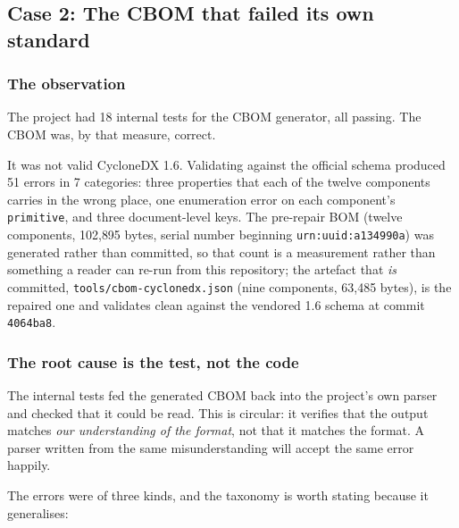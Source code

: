\subsection{Case 2: The CBOM that failed its own standard}
\label{sec:case-study-cbom}

\subsubsection{The observation}

The project had 18 internal tests for the CBOM generator, all passing. The CBOM
was, by that measure, correct.

It was not valid CycloneDX 1.6. Validating against the official schema produced
51 errors in 7 categories: three properties that each of the twelve components
carries in the wrong place, one enumeration error on each component's
\texttt{primitive}, and three document-level keys. The pre-repair BOM (twelve
components, 102{,}895 bytes, serial number beginning
\texttt{urn:uuid:a134990a}) was generated rather than committed, so that count is
a measurement rather than something a reader can re-run from this repository; the
artefact that \emph{is} committed, \texttt{tools/cbom-cyclonedx.json} (nine
components, 63{,}485 bytes), is the repaired one and validates clean against the
vendored 1.6 schema at commit \texttt{4064ba8}.

\subsubsection{The root cause is the test, not the code}

The internal tests fed the generated CBOM back into the project's own parser and
checked that it could be read. This is circular: it verifies that the output
matches \emph{our understanding of the format}, not that it matches the format.
A parser written from the same misunderstanding will accept the same error
happily.

The errors were of three kinds, and the taxonomy is worth stating because it
generalises:

